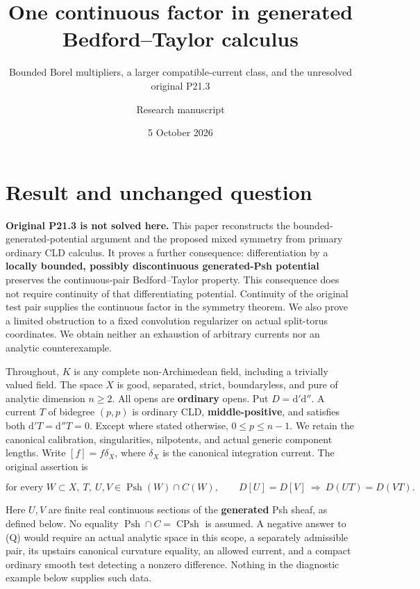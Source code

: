 \documentclass[
  11pt,
]{article}
\title{One continuous factor in generated Bedford--Taylor calculus}
\subtitle{Bounded Borel multipliers, a larger compatible-current class,
and the unresolved original P21.3}
\author{Research manuscript}
\date{5 October 2026}
\begin{document}
\maketitle

\section{Result and unchanged
question}\label{result-and-unchanged-question}

\textbf{Original P21.3 is not solved here.} This paper reconstructs the
bounded-generated-potential argument and the proposed mixed symmetry
from primary ordinary CLD calculus. It proves a further consequence:
differentiation by a \textbf{locally bounded, possibly discontinuous
generated-Psh potential} preserves the continuous-pair Bedford--Taylor
property. This consequence does not require continuity of that
differentiating potential. Continuity of the original test pair supplies
the continuous factor in the symmetry theorem. We also prove a limited
obstruction to a fixed convolution regularizer on actual split-torus
coordinates. We obtain neither an exhaustion of arbitrary currents nor
an analytic counterexample.

Throughout, \(K\) is any complete non-Archimedean field, including a
trivially valued field. The space \(X\) is good, separated, strict,
boundaryless, and pure of analytic dimension \(n\geq2\). All opens are
\textbf{ordinary} opens. Put \(D=\mathrm d'\mathrm d''\). A current
\(T\) of bidegree \((p,p)\) is ordinary CLD, \textbf{middle-positive},
and satisfies both \(\mathrm d'T=\mathrm d''T=0\). Except where stated
otherwise, \(0\leq p\leq n-1\). We retain the canonical calibration,
singularities, nilpotents, and actual generic component lengths. Write
\([f]=f\delta_X\), where \(\delta_X\) is the canonical integration
current. The original assertion is

\[
 \text{for every }W\subset X,\ T,\ U,V\in\operatorname{Psh}(W)\cap C(W),
 \qquad D[U]=D[V]\ \Longrightarrow\ D(UT)=D(VT).                 \tag{Q}
\]

Here \(U,V\) are finite real continuous sections of the
\textbf{generated} Psh sheaf, as defined below. No equality
\(\operatorname{Psh}\cap C=\operatorname{CPsh}\) is assumed. A negative
answer to (Q) would require an actual analytic space in this scope, a
separately admissible pair, its upstairs canonical curvature equality,
an allowed current, and a compact ordinary smooth test detecting a
nonzero difference. Nothing in the diagnostic example below supplies
such data.
\end{document}
